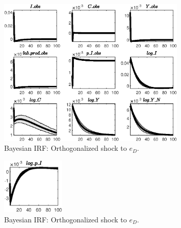 \begin{figure}[H]
\centering 
\includegraphics[width=0.80\textwidth]{BRS_extended_fd/Output/BRS_extended_fd_Bayesian_IRF_e_D_1}
\caption{Bayesian IRF: Orthogonalized shock to ${e_D}$.}
\label{Fig:BayesianIRF:e_D:1}
\end{figure}
 
\begin{figure}[H]
\centering 
\includegraphics[width=0.27\textwidth]{BRS_extended_fd/Output/BRS_extended_fd_Bayesian_IRF_e_D_2}
\caption{Bayesian IRF: Orthogonalized shock to ${e_D}$.}
\label{Fig:BayesianIRF:e_D:2}
\end{figure}
 
